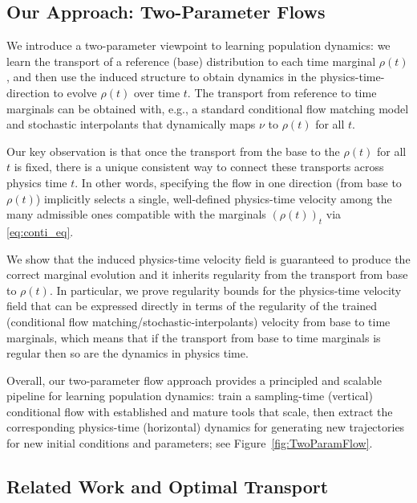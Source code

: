 \documentclass{article}
\theoremstyle{definition}
\theoremstyle{plain}
\theoremstyle{definition}
\theoremstyle{remark}
\begin{document}
\subsection{Our Approach: Two-Parameter Flows}

We introduce a two-parameter viewpoint to learning population dynamics: we learn the transport of a reference (base) distribution to each time marginal $\rho(t)$, and then use the induced structure to obtain dynamics in the physics-time-direction to evolve $\rho(t)$ over time $t$. The transport from reference to time marginals can be obtained with, e.g., a standard conditional flow matching model and stochastic interpolants \cite{lipman2022flow,albergo2023building} that dynamically maps $\nu$ to $\rho(t)$ for all $t$.  

Our key observation is that once the transport from the base to the $\rho(t)$ for all $t$ is fixed, there is a unique consistent way to connect these transports across physics time $t$. In other words, specifying the flow in one direction (from base to $\rho(t)$) implicitly selects a single, well-defined physics-time velocity among the many admissible ones compatible with the marginals $(\rho(t))_t$ via \eqref{eq:conti_eq}. 

We show that the induced physics-time velocity field is guaranteed to produce the correct marginal evolution and it inherits regularity from the transport from base to $\rho(t)$. In particular, we prove regularity bounds for the physics-time velocity field that can be expressed directly in terms of the regularity of the trained (conditional flow matching/stochastic-interpolants) velocity from base to time marginals, which means that if the transport from base to time marginals is regular then so are the dynamics in physics time. 

Overall, our two-parameter flow approach provides a principled and scalable pipeline for learning population dynamics: train a sampling-time (vertical) conditional flow with established and mature tools that scale, then extract the corresponding physics-time (horizontal) dynamics for generating new trajectories for new initial conditions and parameters; see Figure~\ref{fig:TwoParamFlow}.  


\subsection{Related Work and Optimal Transport}
\end{document}
